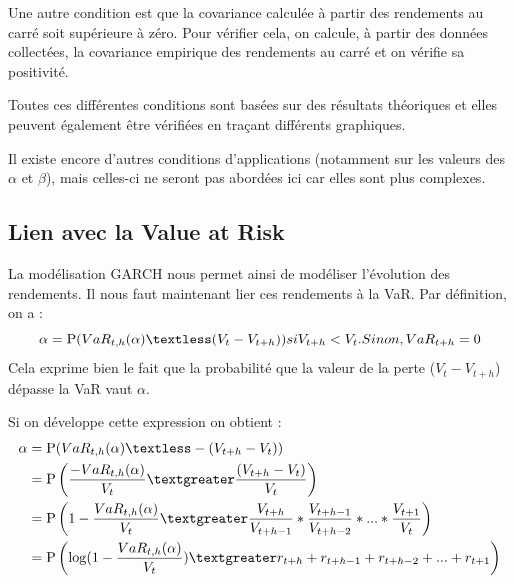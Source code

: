 			Une autre condition est que la covariance calculée à partir des rendements au carré soit supérieure à zéro.
			Pour vérifier cela, on calcule, à partir des données collectées, la covariance empirique des rendements au carré et on vérifie sa positivité.

			Toutes ces différentes conditions sont basées sur des résultats théoriques et elles peuvent également être vérifiées en traçant différents graphiques.

			Il existe encore d'autres conditions d'applications (notamment sur les valeurs des $\alpha$ et $\beta$), mais celles-ci ne seront pas abordées ici car elles sont plus complexes.


		\subsection{Lien avec la Value at Risk}
			La modélisation GARCH nous permet ainsi de modéliser l'évolution des rendements. Il nous faut maintenant lier ces rendements à la VaR.
			Par définition, on a :
			\[\alpha = \mathrm{P}(VaR_{t,h}(\alpha)\textless (V_t - V_{t+h})) si V_{t+h} < V_t. Sinon, VaR_{t+h} = 0\]
			Cela exprime bien le fait que la probabilité que la valeur de la perte ($V_t - V_{t+h}$) dépasse la VaR vaut $\alpha$.
			
			Si on développe cette expression on obtient : 
\begin{align}
\alpha &= \mathrm{P}(VaR_{t,h}(\alpha)\textless -(V_{t+h} - V_t))\\
			&= \mathrm{P}\left(\frac{-VaR_{t,h}(\alpha)}{V_t}\textgreater\frac{(V_{t+h} - V_t)}{V_t}\right)\\
			&= \mathrm{P}\left(1-\frac{VaR_{t,h}(\alpha)}{V_t}\textgreater\frac{V_{t+h}}{V_{t+h-1}}*\frac{V_{t+h-1}}{V_{t+h-2}}*...*\frac{V_{t+1}}{V_{t}}\right)\\
			&= \mathrm{P}\left(\log (1-\frac{VaR_{t,h}(\alpha)}{V_t})\textgreater r_{t+h}+r_{t+h-1}+r_{t+h-2}+...+r_{t+1}\right)
\end{align}

